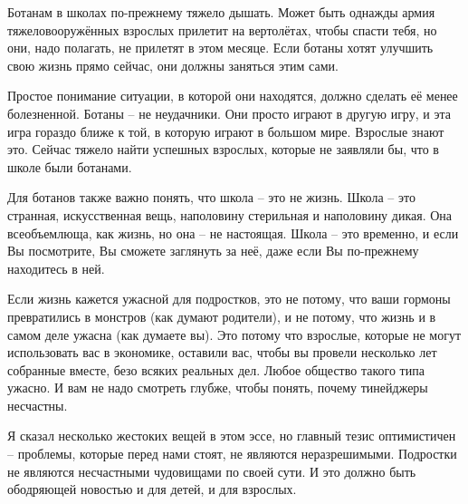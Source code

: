 \documentclass[ebook,12pt,oneside,openany]{memoir}
\begin{document}
Ботанам в школах по-прежнему тяжело дышать. Может быть однажды армия
тяжеловооружённых взрослых прилетит на вертолётах, чтобы спасти тебя,
но они, надо полагать, не прилетят в этом месяце. Если ботаны хотят
улучшить свою жизнь прямо сейчас, они должны заняться этим сами.

Простое понимание ситуации, в которой они находятся, должно сделать её
менее болезненной. Ботаны – не неудачники. Они просто играют в другую
игру, и эта игра гораздо ближе к той, в которую играют в большом мире.
Взрослые знают это. Сейчас тяжело найти успешных взрослых, которые не
заявляли бы, что в школе были ботанами.

Для ботанов также важно понять, что школа – это не жизнь. Школа – это
странная, искусственная вещь, наполовину стерильная и наполовину
дикая. Она всеобъемлюща, как жизнь, но она – не настоящая. Школа – это
временно, и если Вы посмотрите, Вы сможете заглянуть за неё, даже если
Вы по-прежнему находитесь в ней.

Если жизнь кажется ужасной для подростков, это не потому, что ваши
гормоны превратились в монстров (как думают родители), и не потому,
что жизнь и в самом деле ужасна (как думаете вы). Это потому что
взрослые, которые не могут использовать вас в экономике, оставили вас,
чтобы вы провели несколько лет собранные вместе, безо всяких реальных
дел. Любое общество такого типа ужасно. И вам не надо смотреть глубже,
чтобы понять, почему тинейджеры несчастны.

Я сказал несколько жестоких вещей в этом эссе, но главный тезис
оптимистичен – проблемы, которые перед нами стоят, не являются
неразрешимыми. Подростки не являются несчастными чудовищами по своей
сути. И это должно быть ободряющей новостью и для детей, и для
взрослых.
\end{document}
